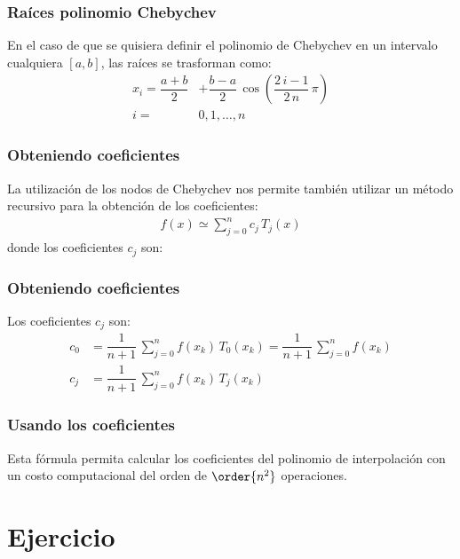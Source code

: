 \begin{frame}
\frametitle{Raíces polinomio Chebychev}
En el caso de que se quisiera definir el polinomio de Chebychev en un intervalo cualquiera $[a, b]$, las raíces se trasforman como:
\begin{align*}
x_{i} = \dfrac{a + b}{2} &+ \dfrac{b - a}{2} \, \cos \left( \dfrac{2 \, i - 1}{2 \, n} \, \pi \right) \\[0.5em] 
i =& 0, 1, \ldots, n
\end{align*}
\end{frame}
\begin{frame}
\frametitle{Obteniendo coeficientes}
La utilización de los nodos de Chebychev nos permite también utilizar un método recursivo para la obtención de los coeficientes:
\begin{align*}
f(x) \simeq \sum_{j=0}^{n} c_{j} \, T_{j}(x)
\end{align*}
donde los coeficientes $c_{j}$ son:
\end{frame}
\begin{frame}
\frametitle{Obteniendo coeficientes}
Los coeficientes $c_{j}$ son:
\begin{align*}
c_{0} &= \dfrac{1}{n + 1} \, \sum_{j=0}^{n} f(x_{k}) \, T_{0}(x_{k}) = \dfrac{1}{n + 1} \, \sum_{j=0}^{n} f(x_{k}) \\[0.5em]
c_{j} &= \dfrac{1}{n + 1} \, \sum_{j=0}^{n} f(x_{k}) \, T_{j}(x_{k})
\end{align*}
\end{frame}
\begin{frame}
\frametitle{Usando los coeficientes}
Esta fórmula permita calcular los coeficientes del polinomio de interpolación con un costo computacional del orden de $\order{n^{2}}$ operaciones.
\end{frame}
\section{Ejercicio}
